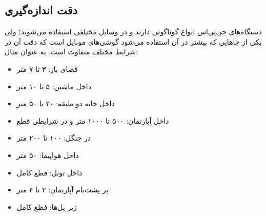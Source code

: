 \subsection{دقت اندازه‌گیری}
دستگاه‌های جی‌پی‌اس انواع گوناگونی دارند و در وسایل مختلفی استفاده می‌شوند؛ ولی یکی از جاهایی که بیشتر در آن استفاده می‌شود گوشی‌های موبایل است که دقت آن در شرایط مختلف متفاوت است. به عنوان مثال:
\begin{itemize}
	\item فضای باز: ۳ تا ۷ متر
	\item داخل ماشین: ۵ تا ۱۰ متر
	\item داخل خانه دو طبقه: ۲۰ تا ۵۰ متر
	\item داخل آپارتمان: ۵۰۰ تا ۱۰۰۰ متر و در شرایطی قطع
	\item در جنگل: ۱۰۰ تا ۲۰۰ متر
	\item داخل هواپیما: ۵۰ متر
	\item داخل تونل: قطع کامل
	\item بر پشت‌بام آپارتمان: ۲ تا ۴ متر
	\item زیر پل‌ها: قطع کامل
\end{itemize}


